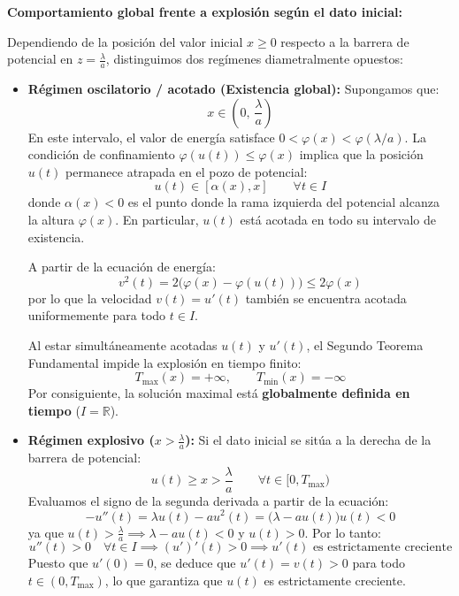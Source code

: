 {\begin{center}
    \end{center}

    \medskip

    \textbf{Comportamiento global frente a explosión según el dato inicial:}

    Dependiendo de la posición del valor inicial $x \geq 0$ respecto a la barrera de potencial en $z = \frac{\lambda}{a}$, distinguimos dos regímenes diametralmente opuestos:

    \begin{itemize}
        \item \textbf{Régimen oscilatorio / acotado (Existencia global):} Supongamos que:
        \[
            x \in \left( 0, \, \frac{\lambda}{a} \right)
        \]
        En este intervalo, el valor de energía satisface $0 < \varphi(x) < \varphi(\lambda/a)$. La condición de confinamiento $\varphi(u(t)) \leq \varphi(x)$ implica que la posición $u(t)$ permanece atrapada en el pozo de potencial:
        \[
            u(t) \in [\alpha(x), x] \qquad \forall t \in I
        \]
        donde $\alpha(x) < 0$ es el punto donde la rama izquierda del potencial alcanza la altura $\varphi(x)$. En particular, $u(t)$ está acotada en todo su intervalo de existencia.
        
        A partir de la ecuación de energía:
        \[
            v^2(t) = 2\bigl(\varphi(x) - \varphi(u(t))\bigr) \leq 2\varphi(x)
        \]
        por lo que la velocidad $v(t) = u'(t)$ también se encuentra acotada uniformemente para todo $t \in I$.

        Al estar simultáneamente acotadas $u(t)$ y $u'(t)$, el Segundo Teorema Fundamental impide la explosión en tiempo finito:
        \[
            T_{\max}(x) = +\infty, \qquad T_{\min}(x) = -\infty
        \]
        Por consiguiente, la solución maximal está \textbf{globalmente definida en tiempo} ($I = \mathbb{R}$).

        \item \textbf{Régimen explosivo ($x > \frac{\lambda}{a}$):} Si el dato inicial se sitúa a la derecha de la barrera de potencial:
        \[
            u(t) \geq x > \frac{\lambda}{a} \qquad \forall t \in [0, T_{\max})
        \]
        Evaluamos el signo de la segunda derivada a partir de la ecuación:
        \[
            -u''(t) = \lambda u(t) - a u^2(t) = \bigl(\lambda - a u(t)\bigr) u(t) < 0
        \]
        ya que $u(t) > \frac{\lambda}{a} \implies \lambda - a u(t) < 0$ y $u(t) > 0$. Por lo tanto:
        \[
            u''(t) > 0 \quad \forall t \in I \implies (u')'(t) > 0 \implies u'(t) \text{ es estrictamente creciente}
        \]
        Puesto que $u'(0) = 0$, se deduce que $u'(t) = v(t) > 0$ para todo $t \in (0, T_{\max})$, lo que garantiza que $u(t)$ es estrictamente creciente.


\end{itemize}}
